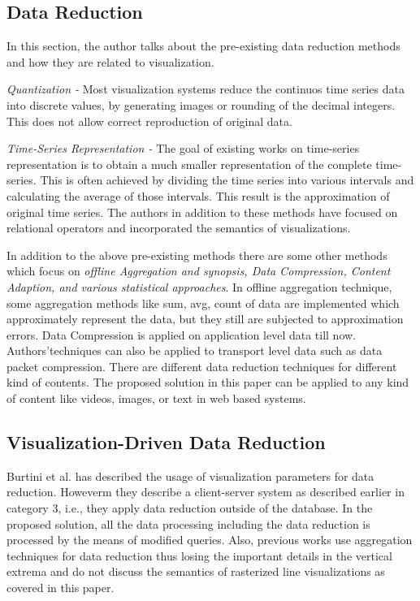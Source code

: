 \subsection{Data Reduction}
In this section, the author talks about the pre-existing data reduction methods and how they are related to visualization.\newline

\textit{Quantization - }
Most visualization systems reduce the continuos time series data into discrete values, by generating images or rounding of the decimal integers. This does not allow correct reproduction of original data. \newline

\textit{Time-Series Representation -}
The goal of existing works on time-series representation is to obtain a much smaller representation of the complete time-series. This is often achieved by dividing the time series into various intervals and calculating the average of those intervals. This result is the approximation of original time series. The authors in addition to these methods have focused on relational operators and incorporated the semantics of visualizations. \newline

In addition to the above pre-existing methods there are some other methods which focus on \textit{offline Aggregation and synopsis, Data Compression, Content Adaption, and various statistical approaches}. In offline aggregation technique, some aggregation methods like sum, avg, count of data are implemented which approximately represent the data, but they still are subjected to approximation errors. Data Compression is applied on application level data till now. Authors’techniques can also be applied to transport level data such as data packet compression. There are different data reduction techniques for different kind of contents. The proposed solution in this paper can be applied to any kind of content like videos, images, or text in web based systems.
\newline

\subsection{Visualization-Driven Data Reduction }

Burtini et al. \cite{burtini2013time} has described the usage of visualization parameters for data reduction. Howeverm they describe a client-server system as described earlier in category 3, i.e., they apply data reduction outside of the database. In the proposed solution, all the data processing including the data reduction is processed by the means of modified queries. Also, previous works use aggregation techniques for data reduction thus losing the important details in the vertical extrema and do not discuss the semantics of rasterized line visualizations as covered in this paper. 
